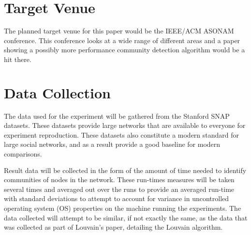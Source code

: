 \documentclass[jair,twoside,11pt,theapa]{article}
\begin{document}
\section{Target Venue}
The planned target venue for this paper would be the IEEE/ACM ASONAM conference. This conference looks at a wide range of different areas and a paper showing a possibly more performance community detection algorithm would be a hit there. 


\section{Data Collection}
The data used for the experiment will be gathered from the Stanford SNAP datasets. These datasets provide large networks that are available to everyone for experiment reproduction. These datasets also constitute a modern standard for large social networks, and as a result provide a good baseline for modern comparisons. 

Result data will be collected in the form of the amount of time needed to identify communities of nodes in the network. These run-times measures will be taken several times and averaged out over the runs to provide an averaged run-time with standard deviations to attempt to account for variance in uncontrolled operating system (OS) properties on the machine running the experiments. The data collected will attempt to be similar, if not exactly the same, as the data that was collected as part of Louvain's paper, detailing the Louvain algorithm.


\vskip 0.2in

\end{document}
